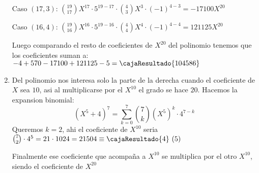 \begin{enumerate}[label=\roman*)]
    Caso $(17,3)$: $\binom{19}{17}X^{17} \cdot 5^{19-17} \cdot \binom{4}{3}X^3 \cdot (-1)^{4-3} = -17100X^{20}$

    Caso $(16,4)$: $\binom{19}{16}X^{16} \cdot 5^{19-16} \cdot \binom{4}{4}X^4 \cdot (-1)^{4-4} = 121125X^{20}$

    Luego comparando el resto de coeficientes de $X^{20}$ del polinomio tenemos que los coeficientes suman a:
    $-4 + 570 - 17100 + 121125 -5 = \cajaResultado{104586}$

    \item Del polinomio nos interesa solo la parte de la derecha cuando el coeficiente de $X$ sea $10$, asi al multiplicarse
    por el $X^{10}$ el grado se hace $20$. Hacemos la expansion binomial: 
    $$
    (X^5 + 4)^7 = \sum_{k=0}^{7} \binom{7}{k} (X^5)^k \cdot 4^{7 - k}
    $$
    Queremos $k = 2$, ahi el coeficiente de $X^{10}$ seria $\binom{7}{2} \cdot 4^{5} = 21 \cdot 1024 = 21504 \equiv \cajaResultado{4} \, \, (5)$
    
    Finalmente ese coeficiente que acompaña a $X^{10}$ se multiplica por el otro $X^{10}$, siendo el coeficiente de $X^{20}$

\end{enumerate}

\begin{aportes}
  \item {}
\end{aportes}
